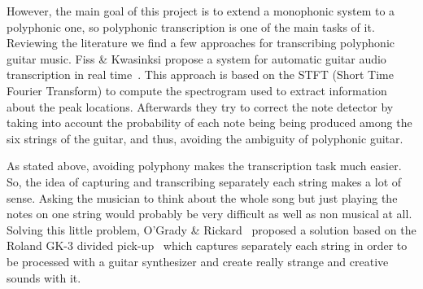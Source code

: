 However, the main goal of this project is to extend a monophonic system to a polyphonic one, so polyphonic transcription is one of the main tasks of it. Reviewing the literature we find a few approaches for transcribing polyphonic guitar music. Fiss \& Kwasinksi propose a system for automatic guitar audio transcription in real time~\cite{Fiss2011}. This approach is based on the STFT (Short Time Fourier Transform) to compute the spectrogram used to extract information about the peak locations. Afterwards they try to correct the note detector by taking into account the probability of each note being being produced among the six strings of the guitar, and thus, avoiding the ambiguity of polyphonic guitar.
 
As stated above, avoiding polyphony makes the transcription task much easier. So, the idea of capturing and transcribing separately each string makes a lot of sense. Asking the musician to think about the whole song but just playing the notes on one string would probably be very difficult as well as non musical at all. Solving this little problem, O'Grady \& Rickard~\cite{OGrady2009} proposed a solution based on the Roland GK-3 divided pick-up~\cite{gk3} which captures separately each string in order to be processed with a guitar synthesizer and create really strange and creative sounds with it. 















\cleardoublepage
